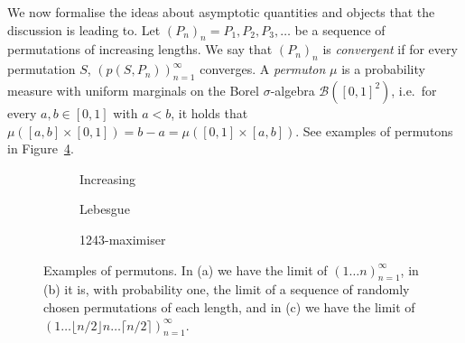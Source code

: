 We now formalise the ideas about asymptotic quantities and objects that the discussion is leading to. Let $(P_n)_n = P_1,P_2,P_3,\ldots$ be a sequence of permutations of increasing lengths. We say that $(P_n)_n$ is \emph{convergent} if for every permutation $S$, $(p(S,P_n))_{n=1}^\infty$ converges. A \emph{permuton} $\mu$ is a probability measure with uniform marginals on the Borel $\sigma$-algebra $\mathcal{B}([0,1]^2)$, i.e.~for every $a,b \in [0,1]$ with $a<b$, it holds that $\mu([a,b] \times [0,1]) = b-a = \mu([0,1] \times [a,b])$. See examples of permutons in Figure~\ref{fig:permutons}. 

\begin{figure}[ht]
  \centering
  \begin{subfigure}[b]{0.3\textwidth}
    \centering
      \caption{\small Increasing}
      \label{fig:increasing}
    \end{subfigure}
    \begin{subfigure}[b]{0.3\textwidth}
      \centering
      \caption{\small Lebesgue}
      \label{fig:lebesgue}
    \end{subfigure}
    \begin{subfigure}[b]{0.3\textwidth}
      \centering
      \caption{\small 1243-maximiser}
      \label{fig:max1243}
    \end{subfigure}
    \caption{\small Examples of permutons. In (a) we have the limit of $(1\ldots n)_{n=1}^\infty$, in (b) it is, with probability one, the limit of a sequence of randomly chosen permutations of each length, and in (c) we have the limit of $(1\ldots \lfloor n/2 \rfloor n \ldots \lceil n/2 \rceil)_{n=1}^\infty$.}
    \label{fig:permutons}
\end{figure}

